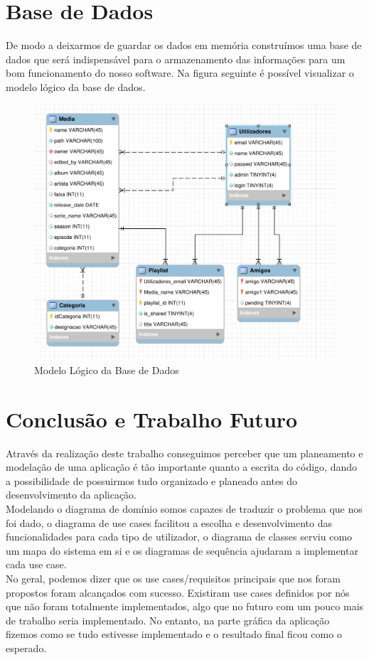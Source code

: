 \documentclass[a4paper]{report}
\begin{document}
\chapter{Base de Dados}
De modo a deixarmos de guardar os dados em memória construímos uma base de dados
que será indispensável para o armazenamento das informações para um bom funcionamento
do nosso software.
Na figura seguinte é possível visualizar o modelo lógico da base de dados.

\begin{figure}[H]
	\centering 
    \includegraphics[width=\textwidth]{images/db.png}  
    \caption{Modelo Lógico da Base de Dados}
\end{figure}

\chapter{Conclusão e Trabalho Futuro}
Através da realização deste trabalho conseguimos perceber que um planeamento e modelação
de uma aplicação é tão importante quanto a escrita do código, dando a possibilidade de 
possuirmos tudo organizado e planeado antes do desenvolvimento da aplicação.\\
Modelando o diagrama de domínio somos capazes de traduzir o problema que nos foi dado,
o diagrama de use cases facilitou a escolha e desenvolvimento das funcionalidades para cada
tipo de utilizador, o diagrama de classes serviu como um mapa do sistema em si e os diagramas
de sequência ajudaram a implementar cada use case.\\
No geral, podemos dizer que os use cases/requisitos principais que nos foram propostos foram 
alcançados com sucesso. Existiram use cases definidos por nós que não foram totalmente
implementados, algo que no futuro com um pouco mais de trabalho seria implementado. No entanto,
na parte gráfica da aplicação fizemos como se tudo estivesse implementado e o resultado final
ficou como o esperado.
 
\end{document}
